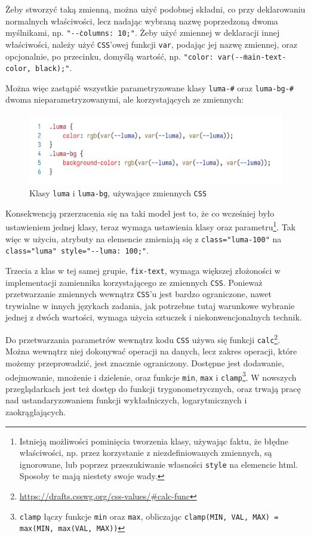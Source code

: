 \documentclass[licencjacka]{pracadypl}
\begin{document}
Żeby stworzyć taką zmienną, można użyć podobnej składni, co przy deklarowaniu normalnych właściwości, lecz nadając wybraną nazwę poprzedzoną dwoma myślnikami, np. \texttt{"-\.-columns: 10;"}. Żeby użyć zmiennej w deklaracji innej właściwości, należy użyć \texttt{CSS}'owej funkcji \texttt{var}, podając jej nazwę zmiennej, oraz opcjonalnie, po przecinku, domyślą wartość, np. \texttt{"color: var(-\.-main-text-color, black);"}.

Można więc zastąpić wszystkie parametryzowane klasy \texttt{luma-\#} oraz \texttt{luma-bg-\#} dwoma nieparametryzowanymi, ale korzystających ze zmiennych:

\begin{figure}[H]
  \centering
  \includegraphics[width=\linewidth]{images/code-css-luma-vars.png}
  \caption{Klasy \texttt{luma} i \texttt{luma-bg}, używające zmiennych \texttt{CSS}}
  \label{fig:css-css-luma-vars}
\end{figure}

Konsekwencją przerzucenia się na taki model jest to, że co wcześniej było ustawieniem jednej klasy, teraz wymaga ustawienia klasy oraz parametru\footnote{Istnieją możliwości pominięcia tworzenia klasy, używając faktu, że błędne właściwości, np. przez korzystanie z niezdefiniowanych zmiennych, są ignorowane, lub poprzez przeszukiwanie własności \texttt{style} na elemencie html. Sposoby te mają niestety swoje wady.}. Tak więc w użyciu, atrybuty na elemencie zmieniają się z \texttt{class="luma-100"} na \texttt{class="luma" style="-\.-luma: 100;"}.

Trzecia z klas w tej samej grupie, \texttt{fix-text}, wymaga większej złożoności w implementacji zamiennika korzystającego ze zmiennych \texttt{CSS}. Ponieważ przetwarzanie zmiennych wewnątrz \texttt{CSS}'u jest bardzo ograniczone, nawet trywialne w innych językach zadania, jak potrzebne tutaj warunkowe wybranie jednej z dwóch wartości, wymaga użycia sztuczek i niekonwencjonalnych technik.

Do przetwarzania parametrów wewnątrz kodu \texttt{CSS} używa się funkcji \texttt{calc}\footnote{\url{https://drafts.csswg.org/css-values/\#calc-func}}. Można wewnątrz niej dokonywać operacji na danych, lecz zakres operacji, które możemy przeprowadzić, jest znacznie ograniczony. Dostępne jest dodawanie, odejmowanie, mnożenie i dzielenie, oraz funkcje \texttt{min}, \texttt{max} i \texttt{clamp}\footnote{\texttt{clamp} łączy funkcje \texttt{min} oraz \texttt{max}, obliczając \texttt{clamp(MIN, VAL, MAX) = max(MIN, max(VAL, MAX))}}. W nowszych przeglądarkach jest też dostęp do funkcji trygonometrycznych, oraz trwają pracę nad ustandaryzowaniem funkcji wykładniczych, logarytmicznych i zaokrąglających.
\end{document}
